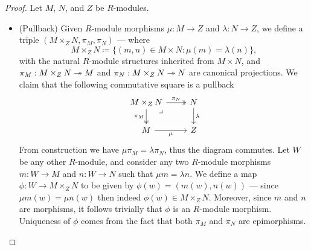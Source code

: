 \begin{proof}
Let \(M\), \(N\), and \(Z\) be \(R\)-modules.
\begin{itemize}\setlength\itemsep{0em}
\item (Pullback) Given \(R\)-module morphisms \(\mu: M \to Z\) and \(\lambda: N
  \to Z\), we define a triple \((M \times_Z N, \pi_M, \pi_N)\) ---
  where
  \[
  M \times_Z N \coloneq \{(m, n) \in M \times N \colon \mu(m) = \lambda(n)\},
  \]
  with the natural \(R\)-module structures inherited from \(M \times N\), and
  \(\pi_M: M \times_Z N \twoheadrightarrow M\) and \(\pi_N: M \times_Z N \twoheadrightarrow N\) are
  canonical projections. We claim that the following commutative square is a
  pullback
  \[
  \begin{tikzcd}
  M \times_Z N \ar[d, two heads, "\pi_M"'] \ar[r, two heads, "\pi_N"]
  \ar[dr, phantom, "\lrcorner", very near start]
  &N \ar[d, "\lambda"] \\
  M \ar[r, "\mu"'] &Z
  \end{tikzcd}
  \]
  From construction we have \(\mu \pi_M = \lambda \pi_N\), thus the diagram
  commutes. Let \(W\) be any other \(R\)-module, and consider any two
  \(R\)-module morphisms \(m: W \to M\) and \(n: W \to N\) such that
  \(\mu m = \lambda n\). We define a map \(\phi: W \to M \times_Z N\) to be
  given by \(\phi(w) = (m(w), n(w))\) --- since \(\mu m(w) = \mu n(w)\) then
  indeed \(\phi(w) \in M \times_Z N\). Moreover, since \(m\) and \(n\) are
  morphisms, it follows trivially that \(\phi\) is an \(R\)-module
  morphism. Uniqueness of \(\phi\) comes from the fact that both \(\pi_M\) and
  \(\pi_N\) are epimorphisms.


\end{itemize}
\end{proof}

